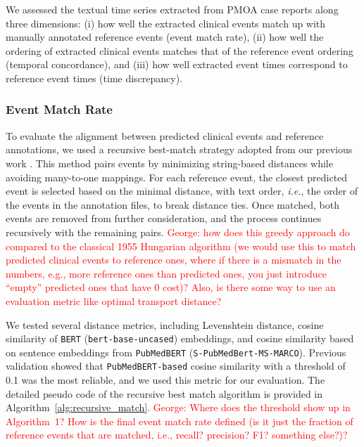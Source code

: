 We assessed the textual time series extracted from PMOA case reports along three dimensions: (i) how well the extracted clinical events match up with manually annotated reference events (event match rate), (ii) how well the ordering of extracted clinical events matches that of the reference event ordering (temporal concordance), and (iii) how well extracted event times correspond to reference event times (time discrepancy). %

\subsubsection{Event Match Rate}
To evaluate the alignment between predicted clinical events and reference annotations, we used a recursive best-match strategy adopted from our previous work \citep{wang2025large}. This method pairs events by minimizing string-based distances while avoiding many-to-one mappings. For each reference event, the closest predicted event is selected based on the minimal distance, with text order, \emph{i.e.}, the order of the events in the annotation files, to break distance ties. Once matched, both events are removed from further consideration, and the process continues recursively with the remaining pairs. \textcolor{red}{George: how does this greedy approach do compared to the classical 1955 Hungarian algorithm (we would use this to match predicted clinical events to reference ones, where if there is a mismatch in the numbers, e.g., more reference ones than predicted ones, you just introduce ``empty'' predicted ones that have 0 cost)? Also, is there some way to use an evaluation metric like optimal transport distance?}

We tested several distance metrics, including Levenshtein distance, cosine similarity of \texttt{BERT} (\texttt{bert-base-uncased}) embeddings, and cosine similarity based on sentence embeddings from \texttt{PubMedBERT} (\texttt{S-PubMedBert-MS-MARCO}). Previous validation showed that \texttt{PubMedBERT-based} cosine similarity with a threshold of 0.1 was the most reliable, and we used this metric for our evaluation. The detailed pseudo code of the recursive best match algorithm is provided in Algorithm~\ref{alg:recursive_match}. \textcolor{red}{George: Where does the threshold show up in Algorithm~1? How is the final event match rate defined (is it just the fraction of reference events that are matched, i.e., recall? precision? F1? something else?)?}


